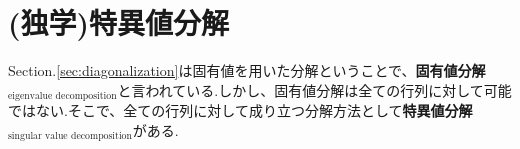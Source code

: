 \section{(独学)特異値分解}
Section.\ref{sec:diagonalization}は固有値を用いた分解ということで、\textbf{固有値分解$_{\text{eigenvalue decomposition}}$}と言われている.しかし、固有値分解は全ての行列に対して可能ではない.そこで、全ての行列に対して成り立つ分解方法として\textbf{特異値分解$_{\text{singular value decomposition}}$}がある.\\